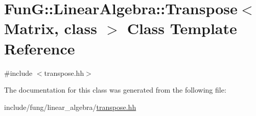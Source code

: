 \hypertarget{classFunG_1_1LinearAlgebra_1_1Transpose}{}\section{FunG\+:\+:Linear\+Algebra\+:\+:Transpose$<$ Matrix, class $>$ Class Template Reference}
\label{classFunG_1_1LinearAlgebra_1_1Transpose}


{\ttfamily \#include $<$transpose.\+hh$>$}



The documentation for this class was generated from the following file\+:\begin{DoxyCompactItemize}
\item 
include/fung/linear\+\_\+algebra/\hyperlink{transpose_8hh}{transpose.\+hh}\end{DoxyCompactItemize}
